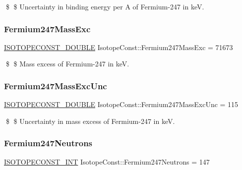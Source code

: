 \$ \$ Uncertainty in binding energy per A of Fermium-\/247 in keV. \mbox{\label{group___isotope_const-_fermium-_fm247_gaf081434e5231bb7d45581f4555ad6490}} 
\subsubsection{\texorpdfstring{Fermium247\+Mass\+Exc}{Fermium247MassExc}}
{\footnotesize\ttfamily \mbox{\hyperlink{group___isotope_const-_macros_ga8f45a7272ce02c0b4c65c44636ed719a}{I\+S\+O\+T\+O\+P\+E\+C\+O\+N\+S\+T\+\_\+\+D\+O\+U\+B\+LE}} Isotope\+Const\+::\+Fermium247\+Mass\+Exc = 71673}

\$ \$ Mass excess of Fermium-\/247 in keV. \mbox{\label{group___isotope_const-_fermium-_fm247_ga9168871d323e946e38a6f25a8caaae66}} 
\subsubsection{\texorpdfstring{Fermium247\+Mass\+Exc\+Unc}{Fermium247MassExcUnc}}
{\footnotesize\ttfamily \mbox{\hyperlink{group___isotope_const-_macros_ga8f45a7272ce02c0b4c65c44636ed719a}{I\+S\+O\+T\+O\+P\+E\+C\+O\+N\+S\+T\+\_\+\+D\+O\+U\+B\+LE}} Isotope\+Const\+::\+Fermium247\+Mass\+Exc\+Unc = 115}

\$ \$ Uncertainty in mass excess of Fermium-\/247 in keV. \mbox{\label{group___isotope_const-_fermium-_fm247_ga55e076cdf6ccf6dd813599d8f692025c}} 
\subsubsection{\texorpdfstring{Fermium247\+Neutrons}{Fermium247Neutrons}}
{\footnotesize\ttfamily \mbox{\hyperlink{group___isotope_const-_macros_ga5f18360b3e99483a35c32d789e62621c}{I\+S\+O\+T\+O\+P\+E\+C\+O\+N\+S\+T\+\_\+\+I\+NT}} Isotope\+Const\+::\+Fermium247\+Neutrons = 147}


